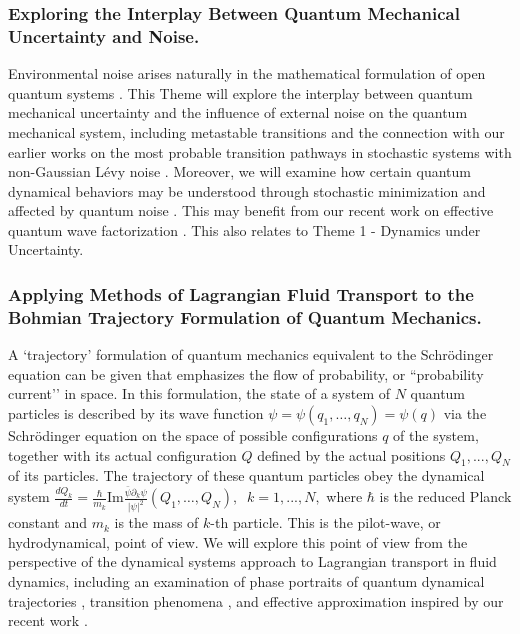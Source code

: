 \documentclass[11pt]{NSFamsart}
\begin{document}
\subsubsection*{Exploring the Interplay Between Quantum Mechanical Uncertainty and Noise.}  Environmental noise   arises naturally in the mathematical formulation of open quantum systems \cite{Lidar2019LectureNO, Breuer2002TheTO,Macieszczak2021TheoryOC, Griffiths2018IntroductionTQ}. This Theme will explore the interplay between quantum mechanical uncertainty and the influence of external noise \cite{Lindgren2019QuantumMC, Nagasawa2000StochasticPI} on the quantum mechanical system, including metastable transitions \cite{Macieszczak2021TheoryOC, Rose2019MetastabilityRA} and the connection with our earlier works on the most probable transition pathways in stochastic systems with non-Gaussian L\'evy noise \cite{ChaoDuanOM}. Moreover, we will examine how certain quantum dynamical behaviors  may be understood through stochastic minimization \cite{Lindgren2019QuantumMC} and affected by quantum noise \cite{Nurdin2019QuantumSP}. This may   benefit from our recent work on effective quantum wave factorization \cite{ZHANG2020132573}. This also relates to   Theme 1 - Dynamics under Uncertainty.


\subsubsection*{Applying Methods of Lagrangian Fluid Transport to the Bohmian Trajectory Formulation of Quantum Mechanics.}   A `trajectory'  formulation of quantum mechanics  equivalent to the Schr\"{o}dinger equation can be given \cite{Bohmian, Holland1993TheQT} that emphasizes the flow of probability, or ``probability current’’ in space. 
In this formulation, the state of a system of $N$ quantum particles is described by its wave function $\psi=\psi(q_1,…,q_N)=\psi(q)$ via the Schr\"{o}dinger equation  on the space of possible configurations $q$ of the system, together with its actual configuration $Q$ defined by the actual positions $Q_1,...,Q_N$ of its particles. The trajectory of these quantum particles obey the dynamical system
$
\frac{dQ_k}{dt}= \frac{\hbar}{m_k} \text{Im} \frac{\bar\psi  \partial_k \psi}{|\psi|^2}(Q_1,…,Q_N),\;\; k=1, ..., N,  
$
where $\hbar$ is the reduced Planck constant and $m_k$ is the mass of $k$-th particle.
This is the pilot-wave, or hydrodynamical, point of view. We will explore this point of view from the perspective of the dynamical systems approach to Lagrangian transport in fluid dynamics, including an examination of phase portraits of quantum dynamical trajectories \cite{Berndl1995OnTG}, transition phenomena \cite{waalkens2007wigner,Micha2006QuantumDW, Dittrich2016}, and effective approximation inspired by our recent work \cite{Li2021BohmianTO}. 
\end{document}
